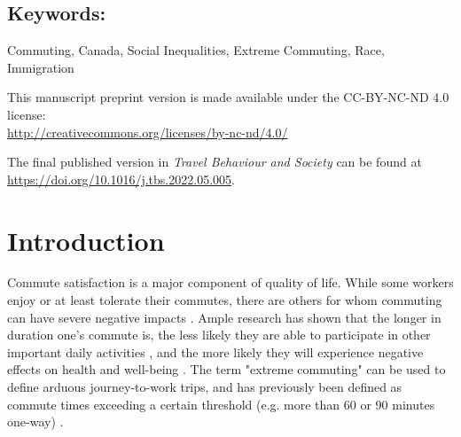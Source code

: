 \documentclass[10 pt,letterpaper]{article}
\begin{document}
	
	
	\subsection*{{Keywords:}}
	\vspace{-5mm}
	Commuting, Canada, Social Inequalities, Extreme Commuting, Race, Immigration
	
	
	\vspace{15mm}
	
	This manuscript preprint version is made available under the CC-BY-NC-ND 4.0 license: \\
	\url{http://creativecommons.org/licenses/by-nc-nd/4.0/}
	
	The final published version in \textit{Travel Behaviour and Society} can be found at
	\\ \url{https://doi.org/10.1016/j.tbs.2022.05.005}. 
	
	\normalsize
	


\vspace{4mm}

\vspace{4mm}



	


\newpage

\section{Introduction}

Commute satisfaction is a major component of quality of life. While some workers enjoy or at least tolerate their commutes, there are others for whom commuting can have severe negative impacts \cite{novaco_transportation_1979,chatterjee_commuting_2020}. Ample research has shown that the longer in duration one's commute is, the less likely they are able to participate in other important daily activities \cite{farber_running_2011, hilbrecht_highway_2014}, and the more likely they will experience negative effects on health and well-being \cite{morris_are_2015,st-louis_happy_2014}. The term "extreme commuting" can be used to define arduous journey-to-work trips, and has previously been defined as commute times exceeding a certain threshold (e.g. more than 60 or 90 minutes one-way) \cite{marion_comparison_2007,maoh_determinants_2012-1,vincent-geslin_determinants_2016,bai_exploring_2020}.
\end{document}
